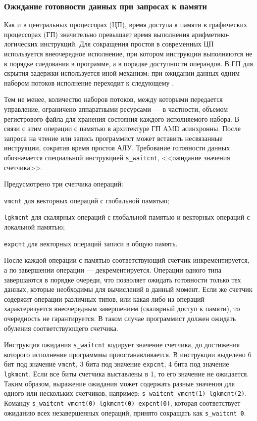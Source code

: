 \documentclass[a4paper,14pt]{extarticle}
\begin{document}
{\subsubsection{Ожидание готовности данных при запросах к памяти}
\label{section:gcn-waitcnt}

Как и в центральных процессорах (ЦП), время доступа к памяти в графических процессорах (ГП)
значительно превышает время выполнения арифметико-логических инструкций.
Для сокращения простоя в современных ЦП используется внеочередное исполнение, при котором
инструкции выполняются не в порядке следования в программе, а в порядке доступности операндов.
В ГП для скрытия задержки используется иной механизм: при ожидании данных одним набором
потоков исполнение переходит к следующему \cite{gcn-performance}.

Тем не менее, количество наборов потоков, между которыми передается управление, ограничено
аппаратными ресурсами — в частности, объемом регистрового файла для хранения состояния каждого
исполняемого набора. В связи с этим операции с памятью в архитектуре ГП AMD асинхронны.
После запроса на чтение или запись программист может вставить несвязанные инструкции,
сократив время простоя АЛУ. Требование готовности данных обозначается специальной
инструкцией \verb|s_waitcnt|, <<ожидание значения счетчика>>.

Предусмотрено три счетчика операций:
\begin{ul}
\item \verb|vmcnt| для векторных операций с глобальной памятью;
\item \verb|lgkmcnt| для скалярных операций с глобальной памятью и векторных операций с локальной памятью;
\item \verb|expcnt| для векторных операций записи в общую память.
\end{ul}

После каждой операции с памятью соответствующий счетчик инкрементируется, а по завершении
операции — декрементируется. Операции одного типа завершаются в порядке очереди, что
позволяет ожидать готовности только тех данных, которые необходимы для вычислений в данный
момент. Если же счетчик содержит операции различных типов, или какая-либо из операций
характеризуется внеочередным завершением (скалярный доступ к памяти), то очередность не гарантируется.
В таком случае программист должен ожидать обуления соответствующего счетчика.

Инструкция ожидания \verb|s_waitcnt| кодирует значение счетчика, до достижения
которого исполнение программмы приостанавливается. В инструкции выделено 6 бит под значение
\verb|vmcnt|, 3 бита под значение \verb|expcnt|, 4 бита под значение \verb|lgkmcnt|.
Если все биты счетчика выставлены в 1, то его значение не ожидается. Таким образом,
выражение ожидания может содержать разные значения для одного или нескольких счетчиков,
например: \verb|s_waitcnt vmcnt(1) lgkmcnt(2)|. Команду
\verb|s_waitcnt vmcnt(0) lgkmcnt(0) expcnt(0)|, которая соответствует ожиданию всех
незавершенных операций, принято сокращать как \verb|s_waitcnt 0|.

}
\end{document}
